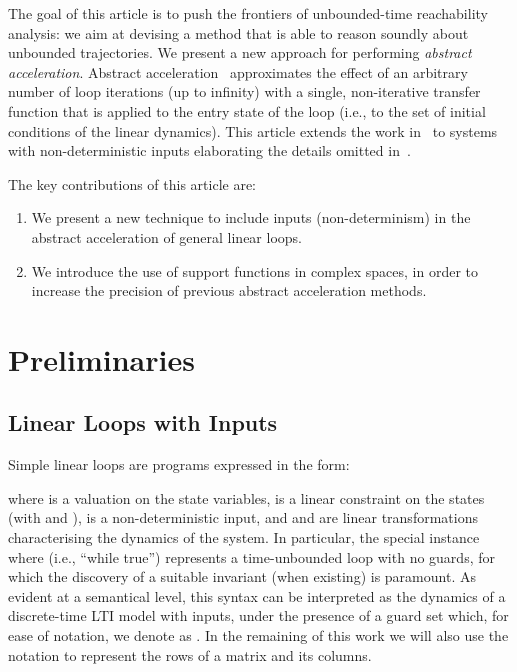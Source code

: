 \documentclass{IEEEtran}
\newcommand{\jrronly}[1]{{}}
\begin{document}
The goal of this article is to push the frontiers of unbounded-time
reachability analysis: we aim at devising a method that is able to
reason soundly about unbounded trajectories.  We present a new
approach for performing \emph{abstract acceleration}.  Abstract
acceleration~\cite{GH06,JSS14,GS14} approximates the effect of an
arbitrary number of loop iterations (up to infinity) with a single,
non-iterative transfer function that is applied to the entry state of
the loop (i.e., to the set of initial conditions of the linear
dynamics).  This article extends the work in~\cite{JSS14} to systems
with non-deterministic inputs \jrronly{and to continuous time models,}
elaborating the details omitted in~\cite{Sch15}.

The key contributions of this article are:

\begin{enumerate}
\item We present a new technique to include inputs (non-determinism) in the
abstract acceleration of general linear loops.
\item We introduce the use of support functions in complex spaces, in order
to increase the precision of previous abstract acceleration methods.
\jrronly{
\item We develop a counterexample-guided refinement for Abstract Acceleration for safety verification, 
maximising speed when precision is not necessary, thus allowing for optimal analysis within a safe region.
\item We extend Abstract Acceleration to the continuous time case.
}
\end{enumerate}


\section{Preliminaries} 


\subsection{Linear Loops with Inputs}\label{sec:linear_loops}


Simple linear loops are programs expressed in the form:

where  is a valuation on the state variables, 
 is a linear constraint on the states (with
 and ), 
 is a non-deterministic input, 
and  and  are linear
transformations characterising the dynamics of the system. 
In particular, the special instance where  (i.e., ``while
true'') represents a time-unbounded loop with no guards, for which the
discovery of a suitable invariant (when existing) is paramount.
As evident at a semantical level, this syntax can be
interpreted as the dynamics of a discrete-time LTI model with inputs, under
the presence of a guard set which, for ease of notation, we denote as .
In the remaining of this work we will also use the notation 
to represent the rows of a matrix and  its columns.
\end{document}
